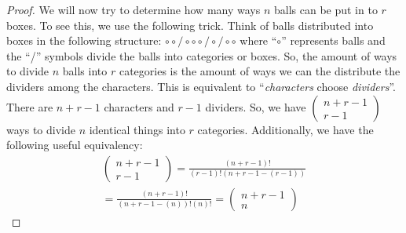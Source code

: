 \documentclass[11pt]{article}
\theoremstyle{definition}
\begin{document}
\begin{proof}
We will now try to determine how many ways $n$ balls can be put in to $r$ boxes. To see this, we use the following trick. Think of balls distributed into boxes in the following structure: $\circ \circ / \circ \circ \circ / \circ / \circ \circ$ where ``$\circ$'' represents balls and the ``/'' symbols divide the balls into categories or boxes. So, the amount of ways to divide $n$ balls into $r$ categories is the amount of ways we can the distribute the dividers among the characters. This is equivalent to ``\textit{characters} choose \textit{dividers}''. There are $n+r-1$ characters and $r-1$ dividers. So, we have $(\begin{smallmatrix} n+r-1 \\ r-1 \end{smallmatrix})$ ways to divide $n$ identical things into $r$ categories. Additionally, we have the following useful equivalency:
\begin{align*}
    \begin{pmatrix} n+r-1 \\ r-1 \end{pmatrix}
    =\frac{(n+r-1)!}{(r-1)!(n+r-1-(r-1))} \\
    =\frac{(n+r-1)!}{(n+r-1-(n))!(n)!}
    = \begin{pmatrix} n+r-1 \\ n \end{pmatrix}
\end{align*}
\end{proof}
\end{document}
